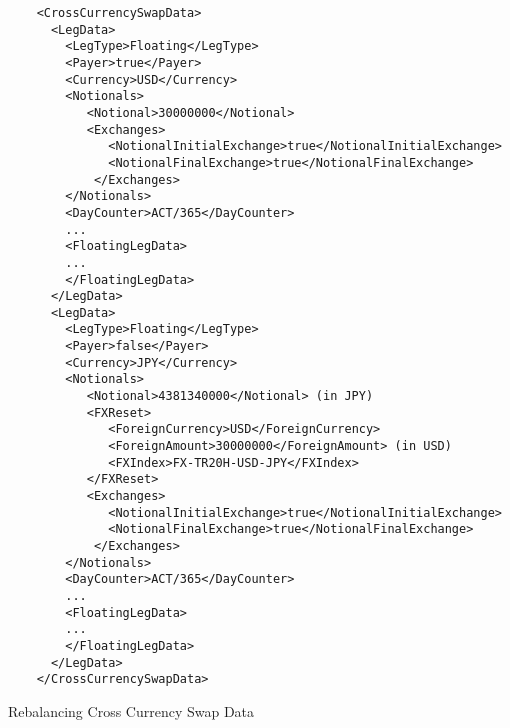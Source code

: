 \begin{listing}[H]
\begin{verbatim}
    <CrossCurrencySwapData>
      <LegData>
        <LegType>Floating</LegType>
        <Payer>true</Payer>
        <Currency>USD</Currency>
        <Notionals>
           <Notional>30000000</Notional>
           <Exchanges>
              <NotionalInitialExchange>true</NotionalInitialExchange>
              <NotionalFinalExchange>true</NotionalFinalExchange>
            </Exchanges>
        </Notionals>
        <DayCounter>ACT/365</DayCounter>
        ...
        <FloatingLegData>
        ...
        </FloatingLegData>
      </LegData>
      <LegData>
        <LegType>Floating</LegType>
        <Payer>false</Payer>
        <Currency>JPY</Currency>
        <Notionals>
           <Notional>4381340000</Notional> (in JPY)
           <FXReset>
              <ForeignCurrency>USD</ForeignCurrency>
              <ForeignAmount>30000000</ForeignAmount> (in USD)
              <FXIndex>FX-TR20H-USD-JPY</FXIndex>
           </FXReset>
           <Exchanges>
              <NotionalInitialExchange>true</NotionalInitialExchange>
              <NotionalFinalExchange>true</NotionalFinalExchange>
            </Exchanges>
        </Notionals> 
        <DayCounter>ACT/365</DayCounter>
        ...
        <FloatingLegData>
        ...
        </FloatingLegData>
      </LegData>
    </CrossCurrencySwapData>
\end{verbatim}
\caption{Rebalancing Cross Currency Swap Data}
\label{lst:crosscurrencyswapreset}
\end{listing}


